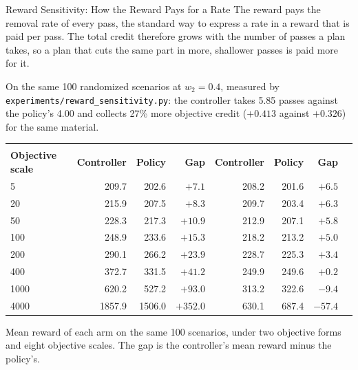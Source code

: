 \documentclass[11pt,aspectratio=169]{beamer}
\begin{document}
\begin{frame}{Reward Sensitivity: How the Reward Pays for a Rate}
    \small
    The reward pays the removal rate of every pass, the standard way to express a rate in a reward
    that is paid per pass. The total credit therefore grows with the number of passes a plan takes,
    so a plan that cuts the same part in more, shallower passes is paid more for it.

    \vspace{0.1em}
    On the same 100 randomized scenarios at $w_2 = 0.4$, measured by
    \texttt{experiments/reward\_sensitivity.py}: the controller takes \alert{5.85 passes} against the
    policy's \alert{4.00} and collects \alert{27\% more objective credit} ($+0.413$ against $+0.326$)
    for the same material.

    \vspace{0.1em}
    \centering
    \scriptsize
    \renewcommand{\arraystretch}{0.9}
    \begin{tabular}{@{}lrrrrrrr@{}}
    \toprule
    &  &  \\
    \cmidrule(lr){2-4}\cmidrule(lr){5-7}
    \textbf{Objective scale} & \textbf{Controller} & \textbf{Policy} & \textbf{Gap} & \textbf{Controller} & \textbf{Policy} & \textbf{Gap} \\
        & 209.7 & 202.6 & $+7.1$  & 208.2 & 201.6 & $+6.5$ \\
    20   & 215.9 & 207.5 & $+8.3$  & 209.7 & 203.4 & $+6.3$ \\
    50   & 228.3 & 217.3 & $+10.9$ & 212.9 & 207.1 & $+5.8$ \\
    100  & \alert{248.9} & 233.6 & $+15.3$ & 218.2 & 213.2 & $+5.0$ \\
    200  & 290.1 & 266.2 & $+23.9$ & 228.7 & 225.3 & $+3.4$ \\
    400  & 372.7 & 331.5 & $+41.2$ & 249.9 & 249.6 & $+0.2$ \\
    1000 & 620.2 & 527.2 & $+93.0$ & 313.2 & 322.6 & $-9.4$ \\
    4000 & 1857.9 & 1506.0 & $+352.0$ & 630.1 & 687.4 & $-57.4$ \\
    \bottomrule
    \end{tabular}

    \vspace{0.2em}
    {\footnotesize
    Mean reward of each arm on the same 100 scenarios, under two objective forms and eight objective
    scales. The gap is the controller's mean reward minus the policy's.}
\end{frame}
\end{document}
